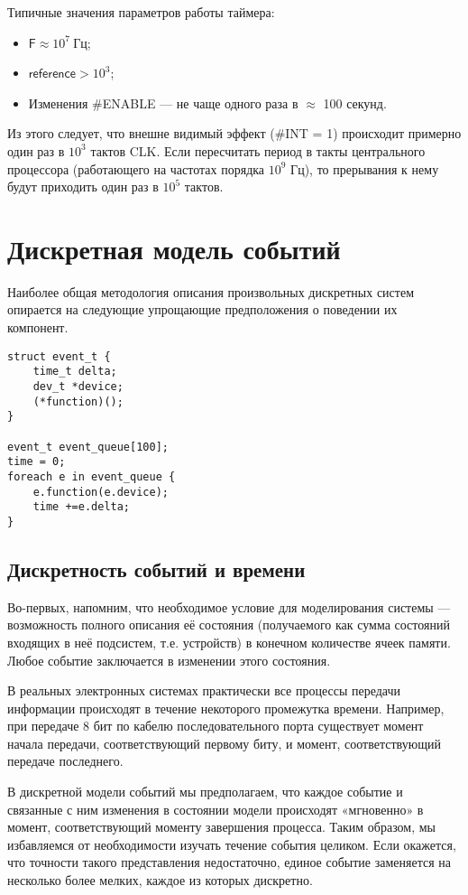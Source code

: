 Типичные значения параметров работы таймера:

\begin{itemize}
    \item $\mathsf{F} \approx 10^7\ \text{Гц}$;
    \item $\mathsf{reference} > 10^3$;
    \item Изменения \#ENABLE — не чаще одного раза в $\approx$ 100 секунд.
\end{itemize}

Из этого следует, что внешне видимый эффект (\#INT = 1) происходит примерно один раз в $10^3$ тактов CLK. Если пересчитать период в такты центрального процессора (работающего на частотах порядка $10^9$ Гц), то прерывания к нему будут приходить один раз в $10^5$ тактов.


\section{Дискретная модель событий}

Наиболее общая методология описания произвольных дискретных систем опирается на следующие упрощающие предположения о поведении их компонент.

\begin{lstlisting}
struct event_t {
    time_t delta;
    dev_t *device;
    (*function)();
}

event_t event_queue[100];
time = 0;
foreach e in event_queue {
    e.function(e.device);
    time +=e.delta;
}
\end{lstlisting}


\subsection{Дискретность событий и времени}

Во-первых, напомним, что необходимое условие для моделирования системы --- возможность полного описания её состояния (получаемого как сумма состояний входящих в неё подсистем, т.е. устройств) в конечном количестве ячеек памяти. Любое событие заключается в изменении этого состояния.

В реальных электронных системах практически все процессы передачи информации происходят в течение некоторого промежутка времени. Например, при передаче 8 бит по кабелю последовательного порта существует момент начала передачи, соответствующий первому биту, и момент, соответствующий передаче последнего.

В дискретной модели событий мы предполагаем, что каждое событие и связанные с ним изменения в состоянии модели происходят «мгновенно» в момент, соответствующий моменту завершения процесса. Таким образом, мы избавляемся от необходимости изучать течение события целиком. Если окажется, что точности такого представления недостаточно, единое событие заменяется на несколько более мелких, каждое из которых дискретно.

